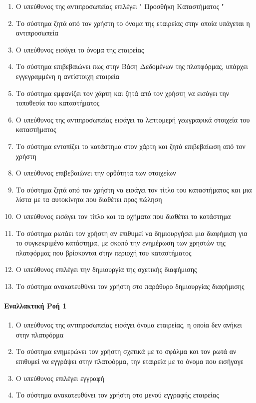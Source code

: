 \documentclass{../ol-softwaremanual}
\begin{document}
	\begin{enumerate}
		\item Ο υπεύθυνος της αντιπροσωπείας επιλέγει \en " \gr Προσθήκη Καταστήματος \en " \gr
		\item Το σύστημα ζητά από τον χρήστη το όνομα της εταιρείας στην οποία υπάγεται η αντιπροσωπεία
		\item Ο υπεύθυνος εισάγει το όνομα της εταιρείας
		\item Το σύστημα επιβεβαιώνει πως στην Βάση Δεδομένων της πλατφόρμας, υπάρχει εγγεγραμμένη η αντίστοιχη εταιρεία		
		\item Το σύστημα εμφανίζει τον χάρτη και ζητά από τον χρήστη να εισάγει την τοποθεσία του καταστήματος
		\item Ο υπεύθυνος της αντιπροσωπείας εισάγει τα λεπτομερή γεωγραφικά στοιχεία του καταστήματος
		\item Το σύστημα εντοπίζει το κατάστημα στον χάρτη και ζητά επιβεβαίωση από τον χρήστη
		\item Ο υπεύθυνος επιβεβαιώνει την ορθότητα των στοιχείων		
		\item Το σύστημα ζητά από τον χρήστη να εισάγει τον τίτλο του καταστήματος και μια λίστα με τα αυτοκίνητα που διαθέτει προς πώληση
		\item Ο υπεύθυνος εισάγει τον τίτλο και τα οχήματα που διαθέτει το κατάστημα
		\item Το σύστημα ρωτάει τον χρήστη αν επιθυμεί να δημιουργήσει μια διαφήμιση για το συγκεκριμένο κατάστημα, με σκοπό την ενημέρωση των χρηστών της πλατφόρμας που βρίσκονται στην περιοχή του καταστήματος
		\item Ο υπεύθυνος επιλέγει την δημιουργία της σχετικής διαφήμισης
		\item Το σύστημα ανακατευθύνει τον χρήστη στο παράθυρο δημιουργίας διαφήμισης			
	\end{enumerate}

	\paragraph{Εναλλακτική Ροή 1}
	
	\begin{enumerate}
		\item Ο υπεύθυνος της αντιπροσωπείας εισάγει όνομα εταιρείας, η οποία δεν ανήκει στην πλατφόρμα
		\item Το σύστημα ενημερώνει τον χρήστη σχετικά με το σφάλμα και τον ρωτά αν επιθυμεί να εγγράψει στην πλατφόρμα, την εταιρεία με το όνομα που εισήγαγε
		\item Ο υπεύθυνος επιλέγει εγγραφή 
		\item Το σύστημα ανακατευθύνει τον χρήστη στο μενού εγγραφής εταιρείας
	\end{enumerate}
\end{document}
